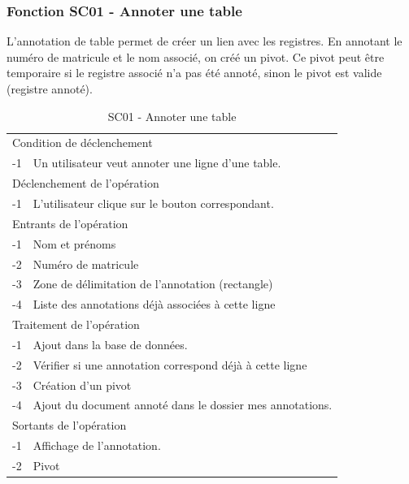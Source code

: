 \documentclass[a4paper]{article}
\begin{document}
\subsubsection{Fonction SC01 - Annoter une table}


L'annotation de table permet de cr\'eer un lien avec les registres. En annotant le num\'ero de matricule et le nom associ\'e, on cr\'e\'e un pivot. Ce pivot peut \^etre temporaire si le registre associ\'e n'a pas \'et\'e annot\'e, sinon le pivot est valide (registre annot\'e).\\

\begin{table}[H]
  \centering
   \small
	\begin{tabular}{|c|p{12cm}|}
   		\hline
   			\rowcolor{lightgray}\multicolumn{2}{|c|}{\textbf{SC01 - Annoter une table}} \\
   		\hline
   			\multicolumn{2}{|l|}{Condition de d\'eclenchement} \\
   		\hline
   		-1 & Un utilisateur veut annoter une ligne d'une table. \\
   		\hline
   			\multicolumn{2}{|l|}{D\'eclenchement de l'op\'eration} \\
   		\hline
   			-1 & L'utilisateur clique sur le bouton correspondant. \\
   		\hline
   			\multicolumn{2}{|l|}{Entrants de l'op\'eration} \\
   		\hline
   			-1 & Nom et pr\'enoms \\
        	-2 & Num\'ero de matricule \\ 
        	-3 & Zone de d\'elimitation de l'annotation (rectangle) \\
            -4 & Liste des annotations d\'ej\`a associ\'ees \`a cette ligne \\
   		\hline
   			\multicolumn{2}{|l|}{Traitement de l'op\'eration} \\
  		\hline
   			-1 & Ajout dans la base de donn\'ees. \\
        	-2 & V\'erifier si une annotation correspond d\'ej\`a \`a cette ligne \\
        	-3 & Cr\'eation d'un pivot \\
            -4 & Ajout du document annot\'e dans le dossier mes annotations. \\
   		\hline
   			\multicolumn{2}{|l|}{Sortants de l'op\'eration} \\
   		\hline
   			-1 & Affichage de l'annotation. \\
            -2 & Pivot \\
   		\hline
	\end{tabular}
  \caption{SC01 - Annoter une table}
  \normalsize
  \label{tab:annoter_table}
\end{table}
\end{document}
